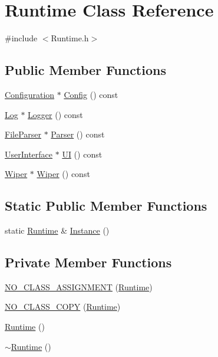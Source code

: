 \section{Runtime Class Reference}
\label{class_runtime}


{\ttfamily \#include $<$Runtime.\-h$>$}

\subsection*{Public Member Functions}
\begin{DoxyCompactItemize}
\item 
\hyperlink{class_configuration}{Configuration} $\ast$ \hyperlink{class_runtime_a42500720bee2cf4002c945b494a44ced}{Config} () const 
\item 
\hyperlink{class_log}{Log} $\ast$ \hyperlink{class_runtime_aa257050eab90cb6493b1cadcd003b67f}{Logger} () const 
\item 
\hyperlink{class_file_parser}{File\-Parser} $\ast$ \hyperlink{class_runtime_ae976465b16782d87ad46b836b63dfb00}{Parser} () const 
\item 
\hyperlink{class_user_interface}{User\-Interface} $\ast$ \hyperlink{class_runtime_ada47d441b13bc24accea9dca292eeced}{U\-I} () const 
\item 
\hyperlink{class_wiper}{Wiper} $\ast$ \hyperlink{class_runtime_a67e200aad11db275aba4230282ce6eae}{Wiper} () const 
\end{DoxyCompactItemize}
\subsection*{Static Public Member Functions}
\begin{DoxyCompactItemize}
\item 
static \hyperlink{class_runtime}{Runtime} \& \hyperlink{class_runtime_a1146c295df34dff8c1935ec0436edd7d}{Instance} ()
\end{DoxyCompactItemize}
\subsection*{Private Member Functions}
\begin{DoxyCompactItemize}
\item 
\hyperlink{class_runtime_a6a3920f0c4052fa28177f539b402d2e4}{N\-O\-\_\-\-C\-L\-A\-S\-S\-\_\-\-A\-S\-S\-I\-G\-N\-M\-E\-N\-T} (\hyperlink{class_runtime}{Runtime})
\item 
\hyperlink{class_runtime_a9b37cdb81eff355717a177408b5c180c}{N\-O\-\_\-\-C\-L\-A\-S\-S\-\_\-\-C\-O\-P\-Y} (\hyperlink{class_runtime}{Runtime})
\item 
\hyperlink{class_runtime_a522dc4b36f2a770bbe3e62c451f38841}{Runtime} ()
\item 
\hyperlink{class_runtime_a69418e2a8c03d0e24cdc63eb88b52d28}{$\sim$\-Runtime} ()
\end{DoxyCompactItemize}


